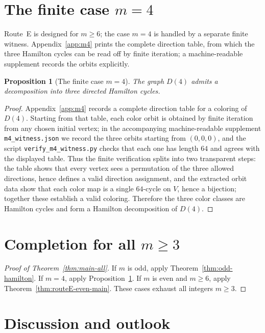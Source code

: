 \documentclass[11pt]{article}
\newtheorem{proposition}{Proposition}
\begin{document}
\section{The finite case $m=4$}\label{sec:m4}

Route~E is designed for $m\ge 6$; the case $m=4$ is handled by a separate finite witness.
Appendix~\ref{app:m4} prints the complete direction table, from which the three Hamilton cycles can be read off by finite iteration; a machine-readable supplement records the orbits explicitly.

\begin{proposition}[The finite case $m=4$]\label{prop:m4-main}
The graph $D(4)$ admits a decomposition into three directed Hamilton cycles.
\end{proposition}

\begin{proof}
Appendix~\ref{app:m4} records a complete direction table for a coloring of $D(4)$.
Starting from that table, each color orbit is obtained by finite iteration from any chosen initial vertex; in the accompanying machine-readable supplement \texttt{m4\_witness.json} we record the three orbits starting from $(0,0,0)$, and the script \texttt{verify\_m4\_witness.py} checks that each one has length $64$ and agrees with the displayed table.
Thus the finite verification splits into two transparent steps: the table shows that every vertex sees a permutation of the three allowed directions, hence defines a valid direction assignment, and the extracted orbit data show that each color map is a single $64$-cycle on $V$, hence a bijection; together these establish a valid coloring.
Therefore the three color classes are Hamilton cycles and form a Hamilton decomposition of $D(4)$.
\end{proof}


\section{Completion for all $m\ge 3$}\label{sec:completion}

\begin{proof}[Proof of Theorem~\ref{thm:main-all}]
If $m$ is odd, apply Theorem~\ref{thm:odd-hamilton}.
If $m=4$, apply Proposition~\ref{prop:m4-main}.
If $m$ is even and $m\ge 6$, apply Theorem~\ref{thm:routeE-even-main}.
These cases exhaust all integers $m\ge 3$.
\end{proof}

\section{Discussion and outlook}\label{sec:discussion}
\end{document}
